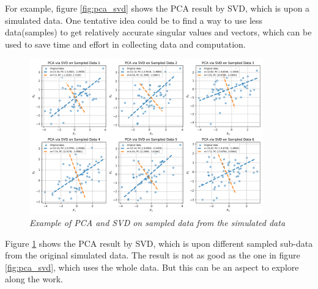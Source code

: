 \documentclass{article}
\begin{document}
For example, figure \ref{fig:pca_svd} shows the PCA result by SVD, which is upon a simulated data.
One tentative idea could be to find a way to use less data(samples) to get relatively accurate 
singular values and vectors, which can be used to save time and effort in collecting data and computation.

\begin{figure}[!h]
    \centering
    \includegraphics[width=0.9\textwidth]{../src_test/results/pca_svd_sampled_data.png}
    \caption{\textit{Example of PCA and SVD on sampled data from the simulated data}}
    \label{fig:pca_svd_2}
\end{figure}

Figure \ref{fig:pca_svd_2} shows the PCA result by SVD, which is upon different sampled sub-data from the 
original simulated data. The result is not as good as the one in figure \ref{fig:pca_svd}, which uses the whole data.
But this can be an aspect to explore along the work.
\end{document}
